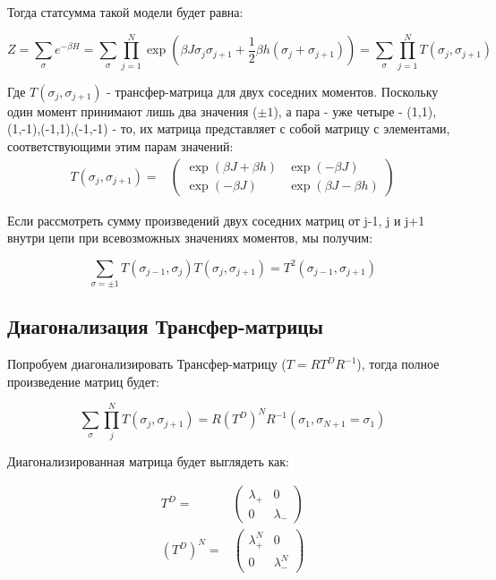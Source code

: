 \documentclass{article}
\newcommand{\bj}{\beta J}
\newcommand{\bh}{\beta h}
\newcommand{\lp}{\lambda_{+}}
\newcommand{\lm}{\lambda_{-}}
\numberwithin{equation}{section}
\begin{document}
Тогда статсумма такой модели будет равна:

\begin{equation}\label{ZTrM}
    Z = \sum_{\sigma} e^{-\beta H} = \sum_{\sigma} \prod_{j=1}^{N} \exp{(\bj\sigma_{j}\sigma_{j+1} + \frac{1}{2}\bh(\sigma_{j} + \sigma_{j+1}))} = \sum_{\sigma} \prod_{j=1}^{N} T(\sigma_{j}, \sigma_{j+1})
\end{equation}
    
Где $T(\sigma_{j}, \sigma_{j+1})$ - трансфер-матрица для двух соседних моментов. Поскольку один момент принимают лишь два значения ($\pm1$), а пара - уже четыре - (1,1),(1,-1),(-1,1),(-1,-1) - то, их матрица представляет с собой матрицу с элементами, соответствующими этим парам значений:
\begin{align}\label{TrM}
  T(\sigma_{j}, \sigma_{j+1}) = &
  \begin{pmatrix}
    \exp{(\bj+\bh)} & \exp(-\bj) \\
    \exp{(-\bj)} & \exp{(\bj-\bh)}
  \end{pmatrix}  
\end{align}

Если рассмотреть сумму произведений двух соседних матриц от j-1, j и j+1 внутри цепи при всевозможных значениях моментов, мы получим:

\[\sum_{\sigma = \pm 1} T(\sigma_{j-1}, \sigma_{j})T(\sigma_{j}, \sigma_{j+1}) = T^{2}(\sigma_{j-1}, \sigma_{j+1})\]

\subsection{Диагонализация Трансфер-матрицы}

Попробуем диагонализировать Трансфер-матрицу ($ T = R T^{D} R^{-1} $), тогда полное произведение матриц будет:

\[ \sum_{\sigma}\prod_{j}^{N} T(\sigma_{j}, \sigma_{j+1}) = R (T^{D})^{N} R^{-1} (\sigma_{1},\sigma_{N+1} = \sigma_{1})\]

Диагонализированная матрица будет выглядеть как:

\begin{align}
T^{D} = &
\begin{pmatrix}\label{Td}
  \lp & 0 \\
  0 & \lm
\end{pmatrix} \\ 
(T^{D})^{N} = &
\begin{pmatrix}
  \lp^{N} & 0 \\
  0 & \lm^{N}
\end{pmatrix}
\end{align}
\end{document}
